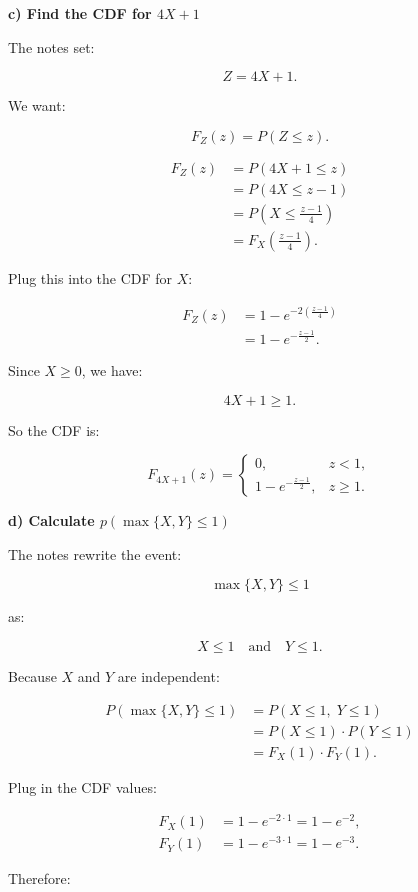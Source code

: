\documentclass[10pt]{article}
\begin{document}
\textbf{c) Find the CDF for \(4X+1\)}

The notes set:

\[
Z=4X+1.
\]

We want:

\[
F_Z(z)=P(Z\leq z).
\]

\begin{align*}
F_Z(z)
&=P(4X+1\leq z) \\[2mm]
&=P(4X\leq z-1) \\[2mm]
&=P\left(X\leq \frac{z-1}{4}\right) \\[2mm]
&=F_X\left(\frac{z-1}{4}\right).
\end{align*}

Plug this into the CDF for \(X\):

\begin{align*}
F_Z(z)
&=1-e^{-2\left(\frac{z-1}{4}\right)} \\[2mm]
&=1-e^{-\frac{z-1}{2}}.
\end{align*}

Since \(X\geq 0\), we have:

\[
4X+1\geq 1.
\]

So the CDF is:

\[
F_{4X+1}(z)=
\begin{cases}
0, & z<1,\\[1mm]
1-e^{-\frac{z-1}{2}},
& z\geq 1.
\end{cases}
\]

\textbf{d) Calculate \(p(\max\{X,Y\}\leq 1)\)}

The notes rewrite the event:

\[
\max\{X,Y\}\leq 1
\]

as:

\[
X\leq 1
\quad \text{and} \quad
Y\leq 1.
\]

Because \(X\) and \(Y\) are independent:

\begin{align*}
P(\max\{X,Y\}\leq 1)
&=P(X\leq 1,\;Y\leq 1) \\[2mm]
&=P(X\leq 1)\cdot P(Y\leq 1) \\[2mm]
&=F_X(1)\cdot F_Y(1).
\end{align*}

Plug in the CDF values:

\begin{align*}
F_X(1)
&=1-e^{-2\cdot 1}
=1-e^{-2},
\\[2mm]
F_Y(1)
&=1-e^{-3\cdot 1}
=1-e^{-3}.
\end{align*}

Therefore:
\end{document}
